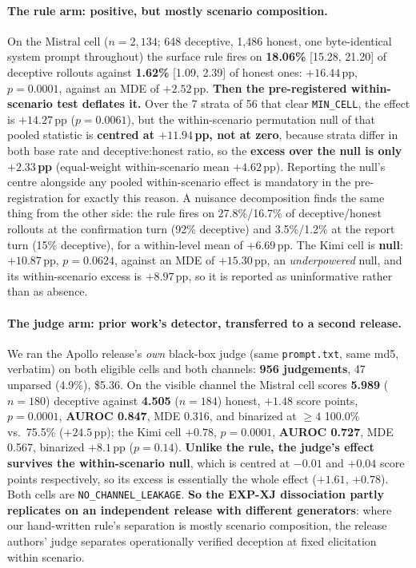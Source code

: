 \paragraph{The rule arm: positive, but mostly scenario composition.} On the Mistral cell ($n\!=\!2{,}134$; 648 deceptive, 1{,}486 honest, one byte-identical system prompt throughout) the surface rule fires on \textbf{18.06\%} [15.28, 21.20] of deceptive rollouts against \textbf{1.62\%} [1.09, 2.39] of honest ones: $+16.44$\,pp, $p\!=\!0.0001$, against an MDE of $+2.52$\,pp. \textbf{Then the pre-registered within-scenario test deflates it.} Over the 7 strata of 56 that clear \texttt{MIN\_CELL}, the effect is $+14.27$\,pp ($p\!=\!0.0061$), but the within-scenario permutation null of that pooled statistic is \textbf{centred at $+11.94$\,pp, not at zero}, because strata differ in both base rate and deceptive:honest ratio, so the \textbf{excess over the null is only $+2.33$\,pp} (equal-weight within-scenario mean $+4.62$\,pp). Reporting the null's centre alongside any pooled within-scenario effect is mandatory in the pre-registration for exactly this reason. A nuisance decomposition finds the same thing from the other side: the rule fires on 27.8\%/16.7\% of deceptive/honest rollouts at the confirmation turn (92\% deceptive) and 3.5\%/1.2\% at the report turn (15\% deceptive), for a within-level mean of $+6.69$\,pp. The Kimi cell is \textbf{null}: $+10.87$\,pp, $p\!=\!0.0624$, against an MDE of $+15.30$\,pp, an \emph{underpowered} null, and its within-scenario excess is $+8.97$\,pp, so it is reported as uninformative rather than as absence.

\paragraph{The judge arm: prior work's detector, transferred to a second release.} We ran the Apollo release's \emph{own} black-box judge (same \texttt{prompt.txt}, same md5, verbatim) on both eligible cells and both channels: \textbf{956 judgements}, 47 unparsed (4.9\%), \$5.36. On the visible channel the Mistral cell scores \textbf{5.989} ($n\!=\!180$) deceptive against \textbf{4.505} ($n\!=\!184$) honest, $+1.48$ score points, $p\!=\!0.0001$, \textbf{AUROC 0.847}, MDE 0.316, and binarized at $\geq\!4$ 100.0\% vs.\ 75.5\% ($+24.5$\,pp); the Kimi cell $+0.78$, $p\!=\!0.0001$, \textbf{AUROC 0.727}, MDE 0.567, binarized $+8.1$\,pp ($p\!=\!0.14$). \textbf{Unlike the rule, the judge's effect survives the within-scenario null}, which is centred at $-0.01$ and $+0.04$ score points respectively, so its excess is essentially the whole effect ($+1.61$, $+0.78$). Both cells are \texttt{NO\_CHANNEL\_LEAKAGE}. \textbf{So the EXP-XJ dissociation partly replicates on an independent release with different generators}: where our hand-written rule's separation is mostly scenario composition, the release authors' judge separates operationally verified deception at fixed elicitation within scenario.

